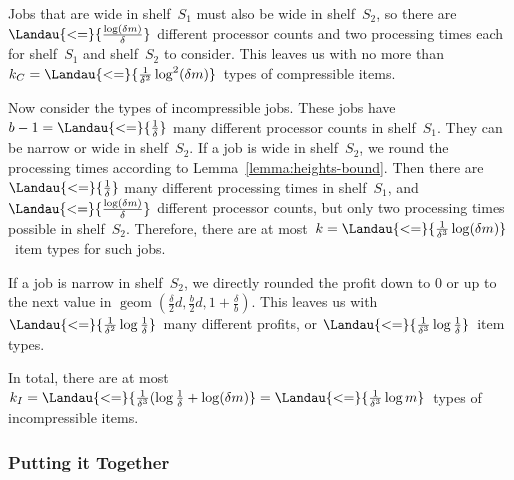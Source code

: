 Jobs that are wide in shelf~$S_1$ must also be wide in shelf~$S_2$,
so there are $\Landau{<=}{\frac{\log (\delta m)}{\delta}}$ different processor counts and two
processing times each for shelf~$S_1$ and shelf~$S_2$ to consider.
This leaves us with no more than $k_C = \Landau{<=}{\frac{1}{\delta^2} \log^2 (\delta m)}$~types of compressible items.

Now consider the types of incompressible jobs.
These jobs have $b-1 = \Landau{<=}{\frac{1}{\delta}}$ many different processor counts in shelf~$S_1$.
They can be narrow or wide in shelf~$S_2$.
If a job is wide in shelf~$S_2$,
we round the processing times according to Lemma~\ref{lemma:heights-bound}.
Then there are $\Landau{<=}{\frac{1}{\delta}}$ many different processing times in shelf~$S_1$,
and $\Landau{<=}{\frac{\log (\delta m)}{\delta}}$ different processor counts, but only two processing times possible in shelf~$S_2$.
Therefore, there are
at most~$k = \Landau{<=}{\frac{1}{\delta^3} \log (\delta m)}$~item types for such jobs.

If a job is narrow in shelf~$S_2$, we directly rounded the profit down to $0$ or
up to the next value in $\mathop{\mathrm{geom}}(\frac{\delta}{2}d, \frac{b}{2}d, 1 + \frac{\delta}{b})$.
This leaves us with $\Landau{<=}{\frac{1}{\delta^2} \log \frac{1}{\delta}}$~many different profits,
or $\Landau{<=}{\frac{1}{\delta^3} \log \frac{1}{\delta}}$~item types.

In total, there are at most $k_I = \Landau{<=}{\frac{1}{\delta^3} (\log \frac{1}{\delta} + \log (\delta m)} = \Landau{<=}{\frac{1}{\delta^3} \log m}$~types of incompressible items.


\subsubsection{Putting it Together}

